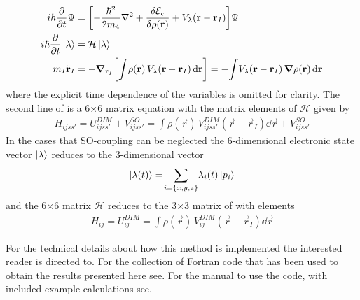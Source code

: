 			\begin{align}
				i\hbar\pdv{t}\Psi &= \qty[-\frac{\hbar^2}{2m_4}\laplacian +\fdv{\mathcal{E}_c}{\rho(\mathbf{r})} + V_\lambda(\vec{r}-\vec{r}_I)]\Psi \nonumber \\
				i\hbar\pdv{t}\ket\lambda  &= \mathcal{H}\ket\lambda \nonumber \\
				m_I\ddot{\vec{r}}_I &= - \grad_{\vec{r}_I}\qty[\int\!\rho(\vec{r})\,V_\lambda(\vec{r}-\vec{r}_I)\dd{\vec{r}}] = -\!\int\!V_\lambda(\vec{r}-\vec{r}_I)\,\grad\rho(\vec{r})\dd{\vec{r}} \label{eq:dyn-el}
			\end{align}
			where the explicit time dependence of the variables is omitted for clarity. The second line of  is a 6$\times$6 matrix equation with the matrix elements of $\mathcal{H}$ given by
			\begin{align}
				H_{ijss'} = U^{DIM}_{ijss'}+V^{SO}_{ijss'} = \int\!\rho(\vec{r})\,V^{DIM}_{ijss'}(\vec{r}-\vec{r}_I)\dd{\vec{r}}+V^{SO}_{ijss'}
			\end{align}
			In the cases that SO-coupling can be neglected the 6-dimensional electronic state vector $\ket{\lambda}$ reduces to the 3-dimensional vector
			\begin{align}
				\ket{\lambda(t)} = \!\sum_{i=\{x,y,z\}} \!\lambda_{i}(t) \ket{p_i}
			\end{align}
			and the 6$\times$6 matrix $\mathcal{H}$ reduces to the 3$\times$3 matrix of  with elements
			\begin{align}
				H_{ij} = U^{DIM}_{ij} = \int\!\rho(\vec{r})\,V^{DIM}_{ij}(\vec{r}-\vec{r}_I)\dd{\vec{r}}
			\end{align}
			
			For the technical details about how this method is implemented the interested reader is directed to. For the collection of Fortran code that has been used to obtain the results presented here see. For the manual to use the code, with included example calculations see.

\clearpage{\pagestyle{empty}\cleardoublepage}